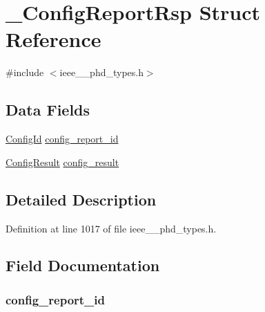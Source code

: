 \hypertarget{struct___config_report_rsp}{}\section{\+\_\+\+Config\+Report\+Rsp Struct Reference}
\label{struct___config_report_rsp}


{\ttfamily \#include $<$ieee\+\_\+\_\+phd\+\_\+types.\+h$>$}

\subsection*{Data Fields}
\begin{DoxyCompactItemize}
\item 
\hyperlink{ieee__11073__phd__types_8h_a4ad2ac77e47838307eaa3229d3102b29}{Config\+Id} \hyperlink{struct___config_report_rsp_a53985454c469ab7ba57b64e680cf8c73}{config\+\_\+report\+\_\+id}
\item 
\hyperlink{ieee__11073__phd__types_8h_a885db3dc1fd3f92dd54705b7b22e92da}{Config\+Result} \hyperlink{struct___config_report_rsp_a47708ebf5413b500c2fcd606e170e2b9}{config\+\_\+result}
\end{DoxyCompactItemize}


\subsection{Detailed Description}


Definition at line 1017 of file ieee\+\_\+\_\+phd\+\_\+types.\+h.



\subsection{Field Documentation}
\hypertarget{struct___config_report_rsp_a53985454c469ab7ba57b64e680cf8c73}{}
\subsubsection[{config\+\_\+report\+\_\+id}]{ config\+\_\+report\+\_\+id}\label{struct___config_report_rsp_a53985454c469ab7ba57b64e680cf8c73}


